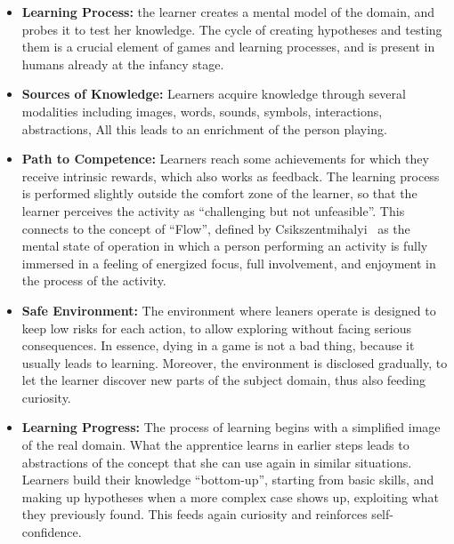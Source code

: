 \begin{itemize}

\item\textbf{Learning Process:} the learner creates a mental model of the domain, and probes it to test her knowledge.
The cycle of creating hypotheses and testing them is a crucial element of games and learning processes, and is present in humans already at the infancy stage.

\item\textbf{Sources of Knowledge:} Learners acquire knowledge through several modalities including images, words, sounds, symbols, interactions, abstractions, \etc All this leads to an enrichment of the person playing.

\item\textbf{Path to Competence:} Learners reach some achievements for which they receive intrinsic rewards, which also works as feedback.
The learning process is performed slightly outside the comfort zone of the learner, so that the learner perceives the activity as ``challenging but not unfeasible''.
This connects to the concept of ``Flow'', defined by Csikszentmihalyi~\cite{Csik1990a} as the mental state of operation in which a person performing an activity is fully immersed in a feeling of energized focus, full involvement, and enjoyment in the process of the activity.

\item\textbf{Safe Environment:} The environment where leaners operate is designed to keep low risks for each action, to allow exploring without facing serious consequences.
In essence, dying in a game is not a bad thing, because it usually leads to learning.
Moreover, the environment is disclosed gradually, to let the learner discover new parts of the subject domain, thus also feeding curiosity.

\item\textbf{Learning Progress:} The process of learning begins with a simplified image of the real domain.
What the apprentice learns in earlier steps leads to abstractions of the concept that she can use again in similar situations.
Learners build their knowledge ``bottom-up'', starting from basic skills, and making up hypotheses when a more complex case shows up, exploiting what they previously found.
This feeds again curiosity and reinforces self-confidence.

\end{itemize}

